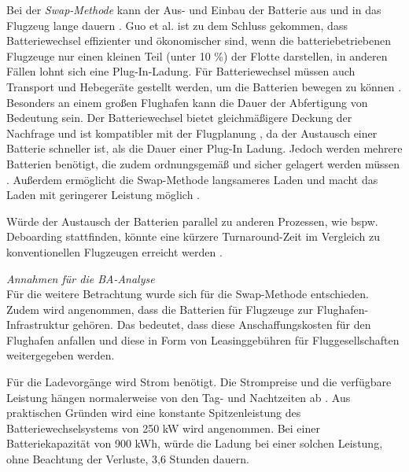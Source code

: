 Bei der \textit{Swap-Methode} kann der Aus- und Einbau der Batterie aus 
und in das Flugzeug lange dauern \cite{dalmia2022powering}. 
Guo et al. \cite{guo2020aviation} ist zu dem Schluss gekommen, 
dass Batteriewechsel effizienter und ökonomischer sind, 
wenn die batteriebetriebenen Flugzeuge nur einen kleinen Teil (unter 10 \%) der Flotte darstellen, 
in anderen Fällen lohnt sich eine Plug-In-Ladung. 
Für Batteriewechsel müssen auch Transport und Hebegeräte gestellt werden, 
um die Batterien bewegen zu können \cite{reimers2018introduction}.
Besonders an einem großen Flughafen kann die Dauer der Abfertigung von Bedeutung sein.
Der Batteriewechsel bietet gleichmäßigere Deckung der Nachfrage \cite{guo2020aviation} 
und ist kompatibler mit der Flugplanung \cite{salucci2020optimal}, 
da der Austausch einer Batterie schneller ist, als die Dauer einer Plug-In Ladung. 
Jedoch werden mehrere Batterien benötigt, 
die zudem ordnungsgemäß und sicher gelagert werden müssen \cite{salucci2020optimal}.
Außerdem ermöglicht die Swap-Methode langsameres Laden und macht 
das Laden mit geringerer Leistung möglich \cite{avogadro2024demystifying}.

Würde der Austausch der Batterien parallel zu anderen Prozessen, 
wie bspw. Deboarding stattfinden, könnte eine kürzere Turnaround-Zeit im 
Vergleich zu konventionellen Flugzeugen erreicht werden \cite{schmidt2016challenges}.

\textit{Annahmen für die BA-Analyse}\\
%
Für die weitere Betrachtung wurde sich für die Swap-Methode entschieden. 
Zudem wird angenommen, dass die Batterien für Flugzeuge zur Flughafen-Infrastruktur gehören.
Das bedeutet, dass diese Anschaffungskosten für den Flughafen anfallen 
und diese in Form von Leasinggebühren für Fluggesellschaften weitergegeben werden.

Für die Ladevorgänge wird Strom benötigt. 
Die Strompreise und die verfügbare Leistung hängen normalerweise 
von den Tag- und Nachtzeiten ab \cite{salucci2020optimal}. 
Aus praktischen Gründen wird eine konstante Spitzenleistung des Batteriewechselsystems von 250 kW wird angenommen. 
Bei einer Batteriekapazität von 900 kWh, würde die Ladung bei einer solchen Leistung, 
ohne Beachtung der Verluste, 3,6 Stunden dauern.

